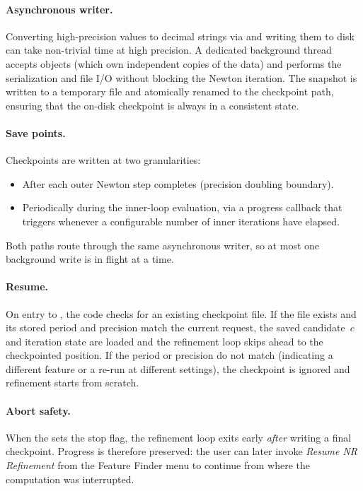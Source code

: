 \paragraph{Asynchronous writer.}
Converting high-precision  values to decimal strings via
 and writing them to disk can take non-trivial
time at high precision.  A dedicated  background
thread accepts  objects (which own independent
copies of the  data) and performs the serialization and
file I/O without blocking the Newton iteration.  The snapshot is
written to a temporary file and atomically renamed to the checkpoint
path, ensuring that the on-disk checkpoint is always in a consistent
state.

\paragraph{Save points.}
Checkpoints are written at two granularities:
\begin{itemize}
  \item After each outer Newton step completes (precision doubling
        boundary).
  \item Periodically during the inner-loop evaluation, via a progress
        callback that triggers whenever a configurable number of
        inner iterations have elapsed.
\end{itemize}
Both paths route through the same asynchronous writer, so at most one
background write is in flight at a time.

\paragraph{Resume.}
On entry to , the code checks for an existing
checkpoint file.  If the file exists and its stored period and precision
match the current request, the saved candidate~$c$ and iteration state
are loaded and the refinement loop skips ahead to the checkpointed
position.  If the period or precision do not match (indicating a
different feature or a re-run at different settings), the checkpoint is
ignored and refinement starts from scratch.

\paragraph{Abort safety.}
When the  sets the stop flag, the refinement loop
exits early \emph{after} writing a final checkpoint.  Progress is
therefore preserved: the user can later invoke \emph{Resume NR
Refinement} from the Feature Finder menu to continue from where the
computation was interrupted.

